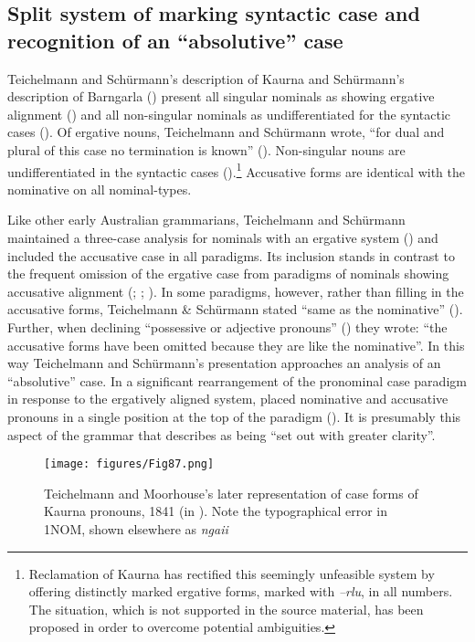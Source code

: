 \subsection{Split system of marking syntactic case and recognition of an “absolutive” case}
\label{sec:key:5.4.1}

Teichelmann and Schürmann’s description of Kaurna and Schürmann’s description of Barngarla () present all singular nominals as showing ergative alignment () and all non-singular nominals as undifferentiated for the syntactic cases (). Of ergative nouns, Teichelmann and Schürmann wrote, “for dual and plural of this case no termination is known” (\citeyear[6]{teichelmann_outlines_1840}). Non-singular nouns are undifferentiated in the syntactic cases ().\footnote{Reclamation of Kaurna \citep[136]{amery_kulurdu_2013} has rectified this seemingly unfeasible system by offering distinctly marked ergative forms, marked with \textit{–rlu}, in all numbers. The situation, which is not supported in the source material, has been proposed in order to overcome potential ambiguities.}  Accusative forms are identical with the nominative on all nominal-types. 

Like other early Australian grammarians, Teichelmann and Schürmann maintained a three-case analysis for nominals with an ergative system () and included the accusative case in all paradigms. Its inclusion stands in contrast to the frequent omission of the ergative case from paradigms of nominals showing accusative alignment (; ; ).
In some paradigms, however, rather than filling in the accusative forms, Teichelmann \& Schürmann stated “same as the nominative” (). Further, when declining “possessive or adjective pronouns” (\citeyear[11--12]{teichelmann_outlines_1840}) they wrote: “the accusative forms have been omitted because they are like the nominative”. In this way Teichelmann and Schürmann’s presentation approaches an analysis of an “absolutive” case.
In a significant rearrangement of the pronominal case paradigm in response to the ergatively aligned system, \citet[49--53]{moorhouse_report_1841} placed nominative and accusative pronouns in a single position at the top of the paradigm (). It is presumably this aspect of the grammar that \citet[108]{amery_warrabarna_2016} describes as being “set out with greater clarity”.
 
\begin{figure}
\texttt{[image: figures/Fig87.png]}
\caption{\label{fig:5:87}Teichelmann and Moorhouse’s later representation of case forms of Kaurna pronouns, 1841 (in \citealt[49]{foster_two_1990}). Note the typographical error in 1NOM, shown elsewhere as \textit{ngaii}}
\end{figure}

